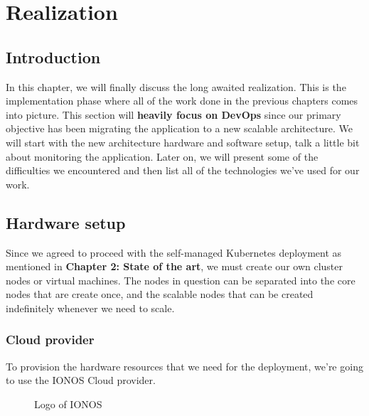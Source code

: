 \chapter{Realization}
\newpage

\setcounter{secnumdepth}{0} %
\section{Introduction}
In this chapter, we will finally discuss the long awaited realization.
This is the implementation phase where all of the work done in the previous chapters comes into picture.
This section will {\bf heavily focus on DevOps} since our primary objective has been migrating the  application to a new scalable architecture.
We will start with the new architecture hardware and software setup, talk a little bit about monitoring the application.
Later on, we will present some of the difficulties we encountered and then list all of the technologies we've used for our work.

\setcounter{secnumdepth}{2} %
\section{Hardware setup}
Since we agreed to proceed with the self-managed Kubernetes deployment as mentioned in \textbf{Chapter 2: State of the art}, we must create our own cluster nodes or virtual machines.
The nodes in question can be separated into the core nodes that are create once, and the scalable nodes that can be created indefinitely whenever we need to scale.

\subsection{Cloud provider}
To provision the hardware resources that we need for the deployment, we're going  to use the IONOS Cloud provider.
\cite[Ionos is a web hosting company founded in Germany in 1988 and is currently owned by United Internet.]{ionos-wikipedia}
\begin{figure}[H]
    \centering
    \caption{Logo of IONOS}
    \label{fig:logo-of-ionos-cloud}
\end{figure}

